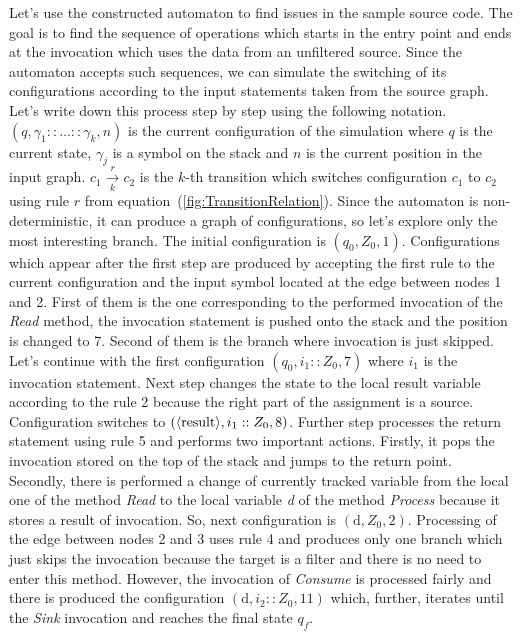 Let's use the constructed automaton to find issues in the sample source code.
The goal is to find the sequence of operations which starts in the entry point and ends at the invocation which uses the data from an unfiltered source.
Since the automaton accepts such sequences, we can simulate the switching of its configurations according to the input statements taken from the source graph.
Let's write down this process step by step using the following notation.
$(q, \gamma_1 :: \ldots :: \gamma_k, n)$ is the current configuration of the simulation where $q$ is the current state, $\gamma_j$ is a symbol on the stack and $n$ is the current position in the input graph.
$c_1 \xrightarrow[k]{r} c_2$ is the $k$-th transition which switches configuration $c_1$ to $c_2$ using rule $r$ from equation~(\ref{fig:TransitionRelation}).
Since the automaton is non-deterministic, it can produce a graph of configurations, so let's explore only the most interesting branch.
The initial configuration is $(q_0, Z_0, 1)$.
Configurations which appear after the first step are produced by accepting the first rule to the current configuration and the input symbol located at the edge between nodes 1 and 2.
First of them is the one corresponding to the performed invocation of the \textit{Read} method, the invocation statement is pushed onto the stack and the position is changed to 7. Second of them is the branch where invocation is just skipped. 
Let's continue with the first configuration $(q_0, i_1 :: Z_0, 7)$ where $i_1$ is the invocation statement.
Next step changes the state to the local \textlangle{}result\textrangle{} variable according to the rule 2 because the right part of the assignment is a source. Configuration switches to $(\text{\textlangle{}result\textrangle{}}, i_1 :: Z_0, 8)$.
Further step processes the return statement using rule 5 and performs two important actions.
Firstly, it pops the invocation stored on the top of the stack and jumps to the return point.
Secondly, there is performed a change of currently tracked variable from the local one of the method \textit{Read} to the local variable \textit{d} of the method \textit{Process} because it stores a result of invocation.
So, next configuration is $(\text{d}, Z_0, 2)$.
Processing of the edge between nodes 2 and 3 uses rule 4 and produces only one branch which just skips the invocation because the target is a filter and there is no need to enter this method.
However, the invocation of \textit{Consume} is processed fairly and there is produced the configuration $(\text{d}, i_2 :: Z_0, 11)$ which, further, iterates until the \textit{Sink} invocation and reaches the final state $q_f$.

